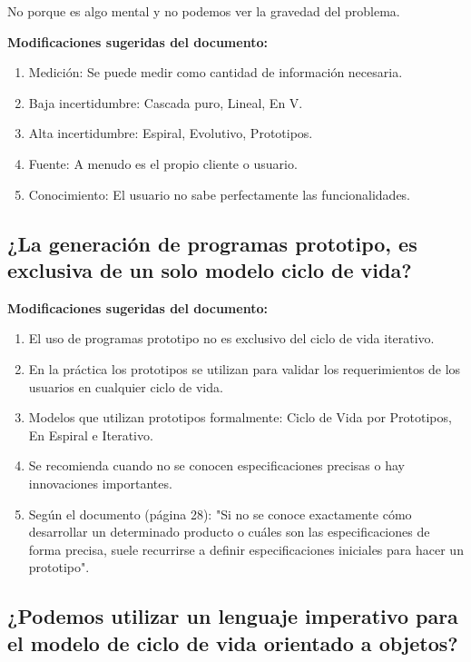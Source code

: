 \documentclass{article}
\begin{document}
No porque es algo mental y no podemos ver la gravedad del problema.

\begin{framed}
\noindent\textbf{Modificaciones sugeridas del documento:}
\begin{enumerate}
    \item Medición: Se puede medir como cantidad de información necesaria.
    \item Baja incertidumbre: Cascada puro, Lineal, En V.
    \item Alta incertidumbre: Espiral, Evolutivo, Prototipos.
    \item Fuente: A menudo es el propio cliente o usuario.
    \item Conocimiento: El usuario no sabe perfectamente las funcionalidades.
\end{enumerate}
\end{framed}

\subsection{¿La generación de programas prototipo, es exclusiva de un solo modelo ciclo de vida?}

\begin{framed}
\noindent\textbf{Modificaciones sugeridas del documento:}
\begin{enumerate}
    \item El uso de programas prototipo no es exclusivo del ciclo de vida iterativo.
    \item En la práctica los prototipos se utilizan para validar los requerimientos de los usuarios en cualquier ciclo de vida.
    \item Modelos que utilizan prototipos formalmente: Ciclo de Vida por Prototipos, En Espiral e Iterativo.
    \item Se recomienda cuando no se conocen especificaciones precisas o hay innovaciones importantes.
    \item Según el documento (página 28): "Si no se conoce exactamente cómo desarrollar un determinado producto o cuáles son las especificaciones de forma precisa, suele recurrirse a definir especificaciones iniciales para hacer un prototipo".
\end{enumerate}
\end{framed}

\subsection{¿Podemos utilizar un lenguaje imperativo para el modelo de ciclo de vida orientado a objetos?}
\end{document}
